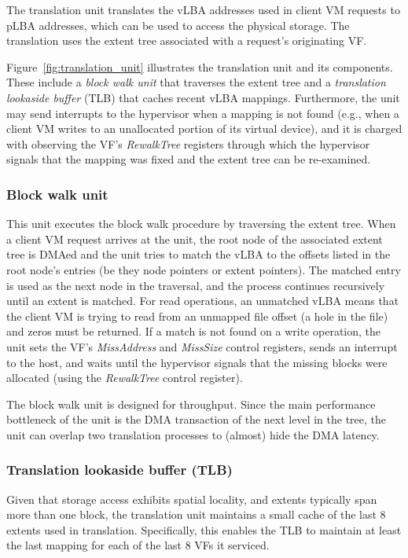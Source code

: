 The translation unit translates the vLBA addresses used in client VM requests to pLBA addresses, which can be used to access the physical storage. The translation uses the extent tree associated with a request's originating VF.

Figure~\ref{fig:translation_unit} illustrates the translation unit and its components. These include a \emph{block walk unit} that traverses the extent tree and a \emph{translation lookaside buffer} (TLB) that caches recent vLBA mappings. Furthermore, the unit may send interrupts to the hypervisor when a mapping is not found (e.g., when a client VM writes to an unallocated portion of its virtual device), and it is charged with observing the VF's \emph{RewalkTree} registers through which the hypervisor signals that the mapping was fixed and the extent tree can be re-examined.

\subsubsection*{Block walk unit}
This unit executes the block walk procedure by traversing the extent tree.
When a client VM request arrives at the unit, the root node of the associated extent tree is DMAed and the unit tries to match the vLBA to the offsets listed in the root node's entries (be they node pointers or extent pointers). The matched entry is used as the next node in the traversal, and the process continues recursively until an extent is matched. For read operations, an unmatched vLBA means that the client VM is trying to read from an unmapped file offset (a hole in the file) and zeros must be returned. If a match is not found on a write operation, the unit sets the VF's \emph{MissAddress} and \emph{MissSize} control registers, sends an interrupt to the host, and waits until the hypervisor signals that the missing blocks were allocated (using the \emph{RewalkTree} control register).

The block walk unit is designed for throughput. Since the main performance bottleneck of the unit is the DMA transaction of the next level in the tree, the unit can overlap two translation processes to (almost) hide the DMA latency.

\subsubsection*{Translation lookaside buffer (TLB)}
Given that storage access exhibits spatial locality, and  extents typically span more than one block, the translation unit maintains a small cache of the last 8 extents used in translation. Specifically, this enables the TLB to maintain at least the last mapping for each of the last 8 VFs it serviced.

